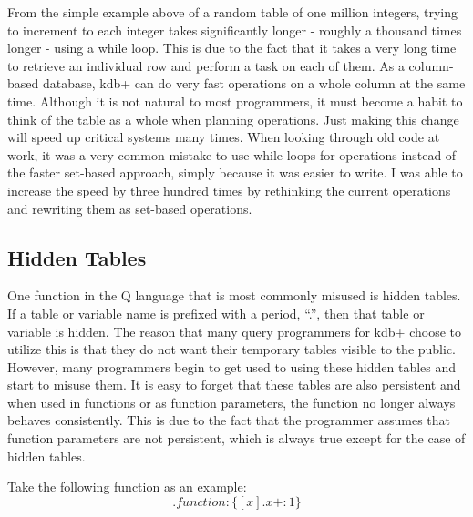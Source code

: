 From the simple example above of a random table of one million integers, trying to increment to each integer takes significantly longer - roughly a thousand times longer - using a while loop.  This is due to the fact that it takes a very long time to retrieve an individual row and perform a task on each of them.  As a column-based database, kdb+ can do very fast operations on a whole column at the same time.  Although it is not natural to most programmers, it must become a habit to think of the table as a whole when planning operations.  Just making this change will speed up critical systems many times.  When looking through old code at work, it was a very common mistake to use while loops for operations instead of the faster set-based approach, simply because it was easier to write.  I was able to increase the speed by three hundred times by rethinking the current operations and rewriting them as set-based operations.


\subsection{Hidden Tables} %
\label{sub:hidden_tables}
One function in the Q language that is most commonly misused is hidden tables.  If a table or variable name is prefixed with a period, ``.'', then that table or variable is hidden.  The reason that many query programmers for kdb+ choose to utilize this is that they do not want their temporary tables visible to the public.  However, many programmers begin to get used to using these hidden tables and start to misuse them.  It is easy to forget that these tables are also persistent and when used in functions or as function parameters, the function no longer always behaves consistently.  This is due to the fact that the programmer assumes that function parameters are not persistent, which is always true except for the case of hidden tables.

Take the following function as an example:
\[.function:\{[x] .x+:1\}\]

